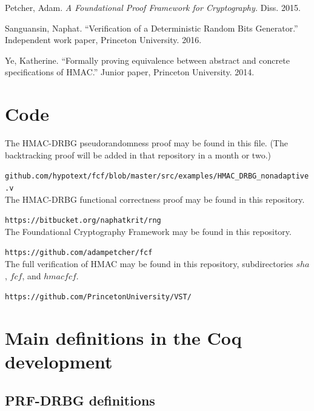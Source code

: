 \documentclass[12pt,lot, lof]{puthesis}
\newcommand{\li} {\lstinline}
\begin{document}
{\begin{thebibliography}{99}
Petcher, Adam. \emph{A Foundational Proof Framework for Cryptography.} Diss. 2015.

Sanguansin, Naphat. ``Verification of a Deterministic Random Bits Generator.'' Independent work paper, Princeton University. 2016.

Ye, Katherine. ``Formally proving equivalence between abstract and concrete specifications of HMAC.'' Junior paper, Princeton University. 2014.

\end{thebibliography}

 \appendix 

\chapter{Code} \label{sec:code}

The HMAC-DRBG pseudorandomness proof may be found in this file. (The backtracking proof will be added in that repository in a month or two.)

\li|github.com/hypotext/fcf/blob/master/src/examples/HMAC_DRBG_nonadaptive.v| \\

\noindent The HMAC-DRBG functional correctness proof may be found in this repository. 

\li|https://bitbucket.org/naphatkrit/rng| \\

\noindent The Foundational Cryptography Framework may be found in this repository. 

\li|https://github.com/adampetcher/fcf| \\

\noindent The full verification of HMAC may be found in this repository, subdirectories $sha$, $fcf$, and $hmacfcf$. 

\li|https://github.com/PrincetonUniversity/VST/|

\chapter{Main definitions in the Coq development} \label{sec:main_definitions_in_the_coq_development}

\section{PRF-DRBG definitions} \label{sec:prf_drbg_definitions}

}
\end{document}
